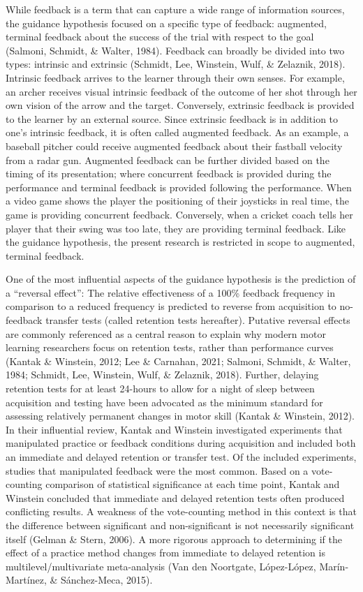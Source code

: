 \documentclass[
  english,
  man, donotrepeattitle,mask,floatsintext]{apa7}
\begin{document}
While feedback is a term that can capture a wide range of information sources, the guidance hypothesis focused on a specific type of feedback: augmented, terminal feedback about the success of the trial with respect to the goal (Salmoni, Schmidt, \& Walter, 1984). Feedback can broadly be divided into two types: intrinsic and extrinsic (Schmidt, Lee, Winstein, Wulf, \& Zelaznik, 2018). Intrinsic feedback arrives to the learner through their own senses. For example, an archer receives visual intrinsic feedback of the outcome of her shot through her own vision of the arrow and the target. Conversely, extrinsic feedback is provided to the learner by an external source. Since extrinsic feedback is in addition to one's intrinsic feedback, it is often called augmented feedback. As an example, a baseball pitcher could receive augmented feedback about their fastball velocity from a radar gun. Augmented feedback can be further divided based on the timing of its presentation; where concurrent feedback is provided during the performance and terminal feedback is provided following the performance. When a video game shows the player the positioning of their joysticks in real time, the game is providing concurrent feedback. Conversely, when a cricket coach tells her player that their swing was too late, they are providing terminal feedback. Like the guidance hypothesis, the present research is restricted in scope to augmented, terminal feedback.

One of the most influential aspects of the guidance hypothesis is the prediction of a ``reversal effect'': The relative effectiveness of a 100\% feedback frequency in comparison to a reduced frequency is predicted to reverse from acquisition to no-feedback transfer tests (called retention tests hereafter). Putative reversal effects are commonly referenced as a central reason to explain why modern motor learning researchers focus on retention tests, rather than performance curves (Kantak \& Winstein, 2012; Lee \& Carnahan, 2021; Salmoni, Schmidt, \& Walter, 1984; Schmidt, Lee, Winstein, Wulf, \& Zelaznik, 2018). Further, delaying retention tests for at least 24-hours to allow for a night of sleep between acquisition and testing have been advocated as the minimum standard for assessing relatively permanent changes in motor skill (Kantak \& Winstein, 2012). In their influential review, Kantak and Winstein investigated experiments that manipulated practice or feedback conditions during acquisition and included both an immediate and delayed retention or transfer test. Of the included experiments, studies that manipulated feedback were the most common. Based on a vote-counting comparison of statistical significance at each time point, Kantak and Winstein concluded that immediate and delayed retention tests often produced conflicting results. A weakness of the vote-counting method in this context is that the difference between significant and non-significant is not necessarily significant itself (Gelman \& Stern, 2006). A more rigorous approach to determining if the effect of a practice method changes from immediate to delayed retention is multilevel/multivariate meta-analysis (Van den Noortgate, López-López, Marín-Martínez, \& Sánchez-Meca, 2015).
\end{document}
